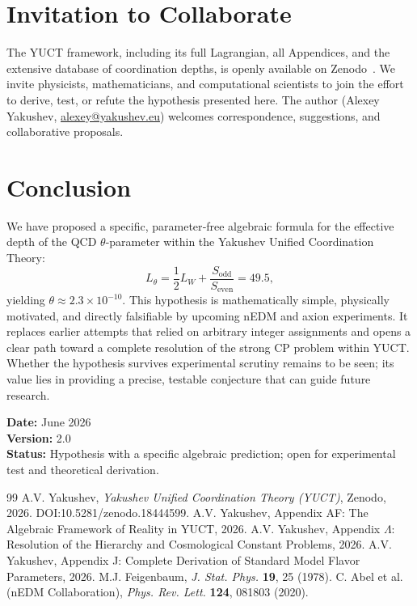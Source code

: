 \documentclass[12pt,a4paper]{article}
\begin{document}
	\section{Invitation to Collaborate}
	\label{sec:invite}
	
	The YUCT framework, including its full Lagrangian, all Appendices, and the extensive database of coordination depths, is openly available on Zenodo~\cite{Y1,Y2}. We invite physicists, mathematicians, and computational scientists to join the effort to derive, test, or refute the hypothesis presented here. The author (Alexey Yakushev, \href{mailto:alexey@yakushev.eu}{alexey@yakushev.eu}) welcomes correspondence, suggestions, and collaborative proposals.
	
	\section{Conclusion}
	\label{sec:conclusion}
	
	We have proposed a specific, parameter‑free algebraic formula for the effective depth of the QCD \(\theta\)-parameter within the Yakushev Unified Coordination Theory:
	\[
	L_\theta = \frac{1}{2}L_W + \frac{S_{\mathrm{odd}}}{S_{\mathrm{even}}} = 49.5,
	\]
	yielding \(\theta \approx 2.3 \times 10^{-10}\). This hypothesis is mathematically simple, physically motivated, and directly falsifiable by upcoming nEDM and axion experiments. It replaces earlier attempts that relied on arbitrary integer assignments and opens a clear path toward a complete resolution of the strong CP problem within YUCT. Whether the hypothesis survives experimental scrutiny remains to be seen; its value lies in providing a precise, testable conjecture that can guide future research.
	
	\vspace{1cm}
	\noindent\textbf{Date:} June 2026\\
	\textbf{Version:} 2.0\\
	\textbf{Status:} Hypothesis with a specific algebraic prediction; open for experimental test and theoretical derivation.
	
	\newpage
	\begin{thebibliography}{99}
		 A.V. Yakushev, \textit{Yakushev Unified Coordination Theory (YUCT)}, Zenodo, 2026. DOI:10.5281/zenodo.18444599.
		 A.V. Yakushev, Appendix AF: The Algebraic Framework of Reality in YUCT, 2026.
		 A.V. Yakushev, Appendix \(\Lambda\): Resolution of the Hierarchy and Cosmological Constant Problems, 2026.
		 A.V. Yakushev, Appendix J: Complete Derivation of Standard Model Flavor Parameters, 2026.
		 M.J. Feigenbaum, \textit{J. Stat. Phys.} \textbf{19}, 25 (1978).
		 C. Abel et al. (nEDM Collaboration), \textit{Phys. Rev. Lett.} \textbf{124}, 081803 (2020).
	\end{thebibliography}
	
\end{document}
